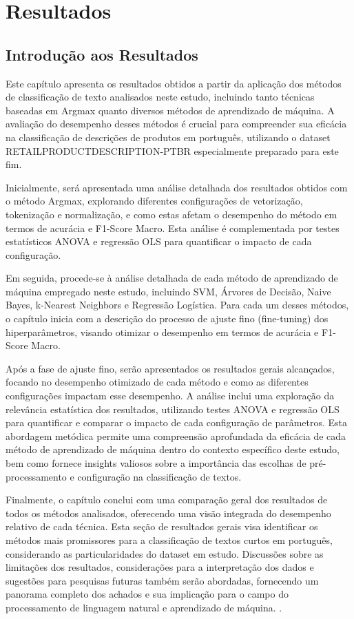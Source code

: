 \chapter{Resultados}


\section{Introdução aos Resultados}

Este capítulo apresenta os resultados obtidos a partir da aplicação dos métodos de classificação de texto analisados neste estudo, incluindo tanto técnicas baseadas em Argmax quanto diversos métodos de aprendizado de máquina. A avaliação do desempenho desses métodos é crucial para compreender sua eficácia na classificação de descrições de produtos em português, utilizando o dataset RETAILPRODUCTDESCRIPTION-PTBR especialmente preparado para este fim.

Inicialmente, será apresentada uma análise detalhada dos resultados obtidos com o método Argmax, explorando diferentes configurações de vetorização, tokenização e normalização, e como estas afetam o desempenho do método em termos de acurácia e F1-Score Macro. Esta análise é complementada por testes estatísticos ANOVA e regressão OLS para quantificar o impacto de cada configuração.

Em seguida, procede-se à análise detalhada de cada método de aprendizado de máquina empregado neste estudo, incluindo SVM, Árvores de Decisão, Naive Bayes, k-Nearest Neighbors e Regressão Logística. Para cada um desses métodos, o capítulo inicia com a descrição do processo de ajuste fino (fine-tuning) dos hiperparâmetros, visando otimizar o desempenho em termos de acurácia e F1-Score Macro. 

Após a fase de ajuste fino, serão apresentados os resultados gerais alcançados, focando no desempenho otimizado de cada método e como as diferentes configurações impactam esse desempenho. A análise inclui uma exploração da relevância estatística dos resultados, utilizando testes ANOVA e regressão OLS para quantificar e comparar o impacto de cada configuração de parâmetros. Esta abordagem metódica permite uma compreensão aprofundada da eficácia de cada método de aprendizado de máquina dentro do contexto específico deste estudo, bem como fornece insights valiosos sobre a importância das escolhas de pré-processamento e configuração na classificação de textos.


Finalmente, o capítulo conclui com uma comparação geral dos resultados de todos os métodos analisados, oferecendo uma visão integrada do desempenho relativo de cada técnica. Esta seção de resultados gerais visa identificar os métodos mais promissores para a classificação de textos curtos em português, considerando as particularidades do dataset em estudo. Discussões sobre as limitações dos resultados, considerações para a interpretação dos dados e sugestões para pesquisas futuras também serão abordadas, fornecendo um panorama completo dos achados e sua implicação para o campo do processamento de linguagem natural e aprendizado de máquina.
.
